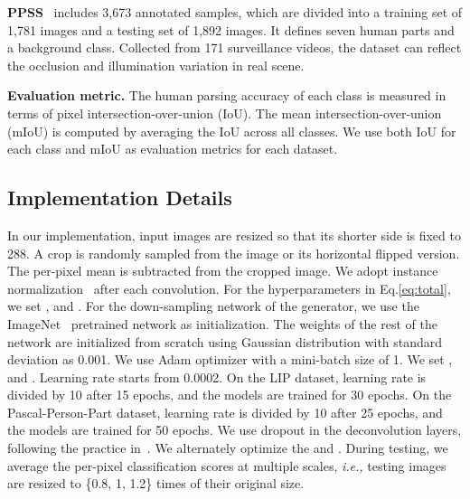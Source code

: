 \documentclass[runningheads]{llncs}
\begin{document}
\textbf{PPSS}~\cite{luo2013pedestrian} includes 3,673 annotated samples, which are divided into a training set of 1,781 images and a testing set of 1,892 images. It defines seven human parts and a background class. Collected from 171 surveillance videos, the dataset can reflect the occlusion and illumination variation in real scene.

\textbf{Evaluation metric.}
The human parsing accuracy of each class is measured in terms of pixel intersection-over-union (IoU). The mean intersection-over-union (mIoU) is computed by averaging the IoU across all classes. We use both IoU for each class and mIoU as evaluation metrics for each dataset.

\subsection{Implementation Details}
In our implementation, input images are resized so that its shorter side is fixed to 288. A  crop is randomly sampled from the image or its horizontal flipped version. The per-pixel mean is subtracted from the cropped image. We adopt instance normalization~\cite{instancenorm} after each convolution. For the hyperparameters in Eq.\ref{eq:total}, we set ,  and . For the down-sampling network of the generator, we use the ImageNet~\cite{deng2009imagenet} pretrained network as initialization. The weights of the rest of the network are initialized from scratch using Gaussian distribution with standard deviation as 0.001. We use Adam optimizer \cite{kingma2014adam} with a mini-batch size of 1. We set ,  and . Learning rate starts from 0.0002. On the LIP dataset, learning rate is divided by 10 after 15 epochs, and the models are trained for 30 epochs. On the Pascal-Person-Part dataset, learning rate is divided by 10 after 25 epochs, and the models are trained for 50 epochs. We use dropout in the deconvolution layers, following the practice in~\cite{isola2017image}. We alternately optimize the  and .
During testing, we average the per-pixel classification scores at multiple scales, \emph{i.e.,} testing images are resized to \{0.8, 1, 1.2\} times of their original size.
\end{document}
